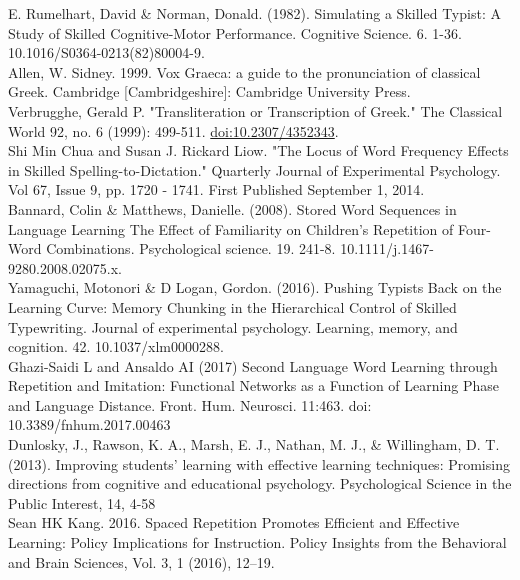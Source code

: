 \documentclass[11pt]{article}
\begin{document}
E. Rumelhart, David \& Norman, Donald. (1982). Simulating a Skilled Typist: A Study of Skilled Cognitive-Motor Performance. Cognitive Science. 6. 1-36. 10.1016/S0364-0213(82)80004-9. \\

Allen, W. Sidney. 1999. Vox Graeca: a guide to the pronunciation of classical Greek. Cambridge [Cambridgeshire]: Cambridge University Press. \\

Verbrugghe, Gerald P. "Transliteration or Transcription of Greek." The Classical World 92, no. 6 (1999): 499-511. \url{doi:10.2307/4352343}. \\

Shi Min Chua and Susan J. Rickard Liow. "The Locus of Word Frequency Effects in Skilled Spelling-to-Dictation."
Quarterly Journal of Experimental Psychology. Vol 67, Issue 9, pp. 1720 - 1741. First Published September 1, 2014. \\

Bannard, Colin \& Matthews, Danielle. (2008). Stored Word Sequences in Language Learning The Effect of Familiarity on Children's Repetition of Four-Word Combinations. Psychological science. 19. 241-8. 10.1111/j.1467-9280.2008.02075.x. \\

Yamaguchi, Motonori \& D Logan, Gordon. (2016). Pushing Typists Back on the Learning Curve: Memory Chunking in the Hierarchical Control of Skilled Typewriting. Journal of experimental psychology. Learning, memory, and cognition. 42. 10.1037/xlm0000288. \\

Ghazi-Saidi L and Ansaldo AI (2017) Second Language Word Learning through Repetition and Imitation: Functional Networks as a Function of Learning Phase and Language Distance. Front. Hum. Neurosci. 11:463. doi: 10.3389/fnhum.2017.00463 \\

Dunlosky, J., Rawson, K. A., Marsh, E. J., Nathan, M. J., \& Willingham, D. T. (2013). Improving students’ learning with effective learning techniques: Promising directions from cognitive and educational psychology. Psychological Science in the Public Interest, 14, 4-58 \\

Sean HK Kang. 2016. Spaced Repetition Promotes Efficient and Effective Learning: Policy Implications for Instruction. Policy Insights from the Behavioral and Brain Sciences, Vol. 3, 1 (2016), 12--19. \\
\end{document}
